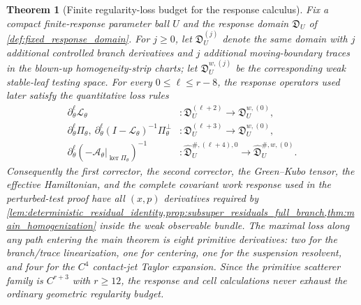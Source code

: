 \documentclass[12pt, letterpaper]{amsart}
\newcommand{\Acal}{\mathcal{A}}
\providecommand{\Ltransfer}{\mathscr{L}}
\providecommand{\Piperp}{\Pi^\perp}
\theoremstyle{plain}
\newtheorem{theorem}{Theorem}[section]
\theoremstyle{definition}
\theoremstyle{remark}
\begin{document}
\begin{theorem}[Finite regularity-loss budget for the response calculus]
\label{thm:response_regularity_loss_budget}
Fix a compact finite-response parameter ball \(U\) and the response domain
\(\mathfrak D_U\) of \cref{def:fixed_response_domain}.  For \(j\ge0\), let
\(\mathfrak D_U^{(j)}\) denote the same domain with \(j\) additional controlled
branch derivatives and \(j\) additional moving-boundary traces in the blown-up
homogeneity-strip charts; let \(\mathfrak D_U^{w,(j)}\) be the corresponding
weak stable-leaf testing space.  For every \(0\le\ell\le r-8\), the response
operators used later satisfy the quantitative loss rules
\begin{align}
    \partial_\theta^\ell\Ltransfer_\theta
       &: \mathfrak D_U^{(\ell+2)}\longrightarrow
          \mathfrak D_U^{w,(0)},\label{eq:response_budget_transfer}\\
    \partial_\theta^\ell\Pi_\theta,\ 
    \partial_\theta^\ell(I-\Ltransfer_\theta)^{-1}\Piperp_\theta
       &: \mathfrak D_U^{(\ell+3)}\longrightarrow
          \mathfrak D_U^{w,(0)},\label{eq:response_budget_projector}\\
    \partial_\theta^\ell(-\Acal_\theta|_{\ker\Pi_\theta})^{-1}
       &: \widehat{\mathfrak D}_U^{\# ,(\ell+4),0}
          \longrightarrow
          \widehat{\mathfrak D}_U^{\#,w,(0)} .
          \label{eq:response_budget_flow_resolvent}
\end{align}
Consequently the first corrector, the second corrector, the Green--Kubo tensor,
the effective Hamiltonian, and the complete covariant work response used in the
perturbed-test proof have all \((x,p)\) derivatives required by
\cref{lem:deterministic_residual_identity,prop:subsuper_residuals_full_branch,thm:main_homogenization}
inside the weak observable bundle.  The maximal loss along any path entering the
main theorem is eight primitive derivatives: two for the branch/trace
linearization, one for centering, one for the suspension resolvent, and four for
the \(C^4\) contact-jet Taylor expansion.  Since the primitive scatterer family is
\(C^{r+3}\) with \(r\ge12\), the response and cell calculations never exhaust the
ordinary geometric regularity budget.
\end{theorem}
\end{document}
